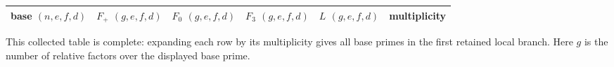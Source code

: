 \begingroup
\scriptsize
\setlength{\tabcolsep}{4.5pt}
\renewcommand{\arraystretch}{1.13}
\begin{tabular}{@{}cccccc@{}}
\toprule
base $(n,e,f,d)$ & $F_+$ $(g,e,f,d)$ & $F_0$ $(g,e,f,d)$ &
$F_3$ $(g,e,f,d)$ & $L$ $(g,e,f,d)$ & multiplicity \\
\midrule
%
\end{tabular}
\par\smallskip
\footnotesize This collected table is complete: expanding each row by its
multiplicity gives all base primes in the first retained local branch.  Here
$g$ is the number of relative factors over the displayed base prime.
\endgroup
